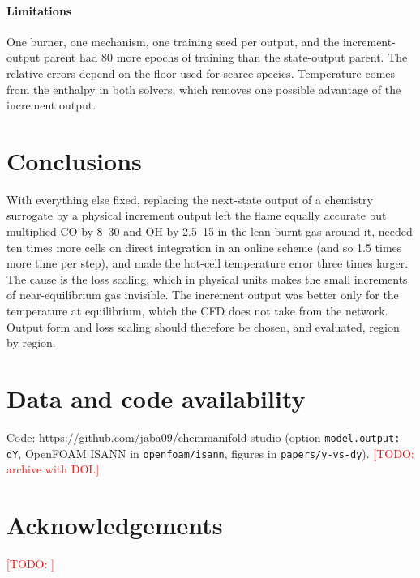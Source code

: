 \documentclass[preprint,review,12pt]{elsarticle}
\newcommand{\todo}[1]{\textcolor{red}{[TODO: #1]}}
\begin{document}
\paragraph{Limitations} One burner, one mechanism, one training seed per output, and the increment-output
parent had 80 more epochs of training than the state-output parent. The relative errors depend on
the floor used for scarce species. Temperature comes from the enthalpy in both solvers, which removes one
possible advantage of the increment output.

\section{Conclusions}
\label{sec:conclusions}

With everything else fixed, replacing the next-state output of a chemistry surrogate by a physical
increment output left the flame equally accurate but multiplied CO by 8--30 and OH by 2.5--15 in the
lean burnt gas around it, needed ten times more cells on direct integration in an online scheme (and
so 1.5 times more time per step), and made the hot-cell temperature error three times larger. The cause is the loss scaling, which in physical
units makes the small increments of near-equilibrium gas invisible. The increment output was better
only for the temperature at equilibrium, which the CFD does not take from the network. Output form and
loss scaling should therefore be chosen, and evaluated, region by region.

\section*{Data and code availability}
Code: \url{https://github.com/jaba09/chemmanifold-studio} (option \texttt{model.output: dY}, OpenFOAM
ISANN in \texttt{openfoam/isann}, figures in \texttt{papers/y-vs-dy}). \todo{archive with DOI.}

\section*{Acknowledgements}
\todo{}



\end{document}
